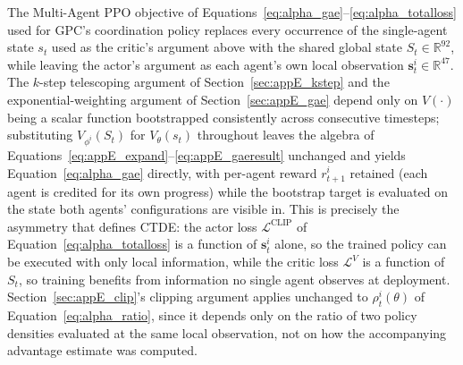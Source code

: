 The Multi-Agent PPO objective of Equations~\eqref{eq:alpha_gae}--\eqref{eq:alpha_totalloss} used for
GPC's coordination policy replaces every occurrence of the single-agent state $s_t$ used as the
critic's argument above with the shared global state $S_t \in \mathbb{R}^{92}$, while leaving the
actor's argument as each agent's own local observation $\mathbf{s}_t^i \in \mathbb{R}^{47}$. The
$k$-step telescoping argument of Section~\ref{sec:appE_kstep} and the exponential-weighting argument
of Section~\ref{sec:appE_gae} depend only on $V(\cdot)$ being a scalar function bootstrapped
consistently across consecutive timesteps; substituting $V_{\phi^i}(S_t)$ for $V_\theta(s_t)$
throughout leaves the algebra of Equations~\eqref{eq:appE_expand}--\eqref{eq:appE_gaeresult}
unchanged and yields Equation~\eqref{eq:alpha_gae} directly, with per-agent reward $r_{t+1}^i$
retained (each agent is credited for its own progress) while the bootstrap target is evaluated on the
state both agents' configurations are visible in. This is precisely the asymmetry that defines CTDE:
the actor loss $\mathcal{L}^{\text{CLIP}}$ of Equation~\eqref{eq:alpha_totalloss} is a function of
$\mathbf{s}_t^i$ alone, so the trained policy can be executed with only local information, while the
critic loss $\mathcal{L}^V$ is a function of $S_t$, so training benefits from information no single
agent observes at deployment. Section~\ref{sec:appE_clip}'s clipping argument applies unchanged to
$\rho_t^i(\theta)$ of Equation~\eqref{eq:alpha_ratio}, since it depends only on the ratio of two
policy densities evaluated at the same local observation, not on how the accompanying advantage
estimate was computed.


